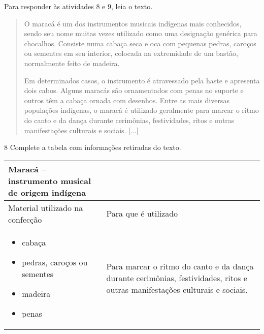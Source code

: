 
Para responder às atividades 8 e 9, leia o texto.

%

\begin{quote}
O maracá é um dos instrumentos musicais indígenas mais conhecidos, sendo
seu nome muitas vezes utilizado como uma designação genérica para
chocalhos. Consiste numa cabaça seca e oca com pequenas pedras, caroços
ou sementes em seu interior, colocada na extremidade de um bastão,
normalmente feito de madeira.

Em determinados casos, o instrumento é atravessado pela haste e
apresenta dois cabos. Alguns maracás são ornamentados com penas no
suporte e outros têm a cabaça ornada com desenhos. Entre as mais
diversas populações indígenas, o maracá é utilizado geralmente para
marcar o ritmo do canto e da dança durante cerimônias, festividades,
ritos e outras manifestações culturais e sociais. {[}...{]}

\end{quote}

\num{8}  Complete a tabela com informações retiradas do texto.

\begin{longtable}[]{@{}ll@{}}
\toprule
\textbf{Maracá -- instrumento musical de origem indígena}\tabularnewline
\midrule
\endhead
Material utilizado na confecção & Para que é utilizado\tabularnewline
\begin{minipage}[t]{0.48\columnwidth}\raggedright\strut
\begin{itemize}
\item
  cabaça
\item
  pedras, caroços ou sementes
\item
  madeira
\item
  penas
\end{itemize}\strut
\end{minipage} & \begin{minipage}[t]{0.48\columnwidth}\raggedright\strut
Para marcar o ritmo do canto e da dança durante cerimônias,
festividades, ritos e outras manifestações culturais e sociais.\strut
\end{minipage}\tabularnewline
\bottomrule
\end{longtable}

